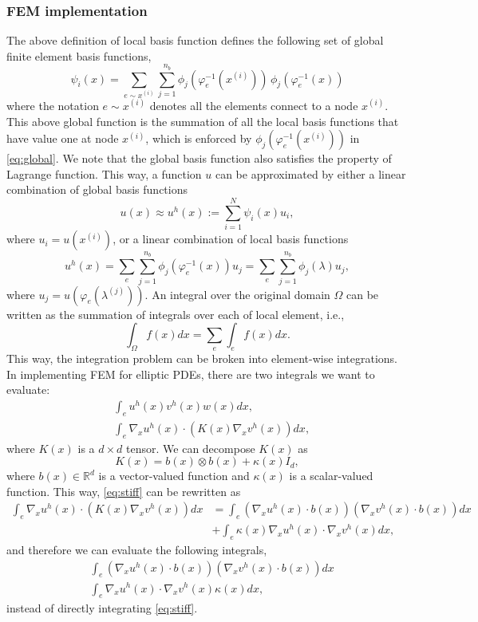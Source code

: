 \documentclass[a4paper,11pt]{scrartcl}
\newcommand{\R}{\mathbb{R}}
\newcommand{\eq}[1]{\begin{equation} #1 \end{equation}}
\newcommand{\eqs}[1]{\begin{align} #1 \end{align}}
\begin{document}
\subsubsection{FEM implementation}

The above definition of local basis function defines the following set of global finite element basis functions,
\eq{
\psi_i(x) =  \sum_{e \sim x^{(i)}} \sum_{j=1}^{n_b} \phi_j( \varphi_e^{-1}(x^{(i)}) ) \, \phi_j( \varphi_e^{-1}(x) ) \label{eq:global}
}
where the notation $e \sim x^{(i)}$ denotes all the elements connect to a node $x^{(i)}$.
%
This above global function is the summation of all the local basis functions that have value one at node $x^{(i)}$, which is enforced by $\phi_j( \varphi_e^{-1}(x^{(i)}) )$ in \eqref{eq:global}.
%
We note that the global basis function also satisfies the property of Lagrange function.
%
This way, a function $u$ can be approximated by either a linear combination of global basis functions
\eq{
u(x) \approx u^h(x) := \sum_{i=1}^{N} \psi_i(x) u_i,
}
where $u_i = u(x^{(i)})$, or a linear combination of local basis functions
\eq{
u^h(x) = \sum_{e} \sum_{j=1}^{n_b} \phi_j( \varphi_e^{-1}(x) ) u_j = \sum_{e} \sum_{j=1}^{n_b} \phi_j( \lambda ) u_j,
}
where $u_j = u(\varphi_e(\lambda^{(j)}))$.
%
An integral over the original domain $\Omega$ can be written as the summation of integrals over each of local element, i.e.,
\eq{
\int_{\Omega} f(x) dx = \sum_{e} \int_e f(x) dx.
}
This way, the integration problem can be broken into element-wise integrations.
%
In implementing FEM for elliptic PDEs, there are two integrals we want to evaluate:
\eqs{
& \int_{e} u^h(x) v^h(x) w(x)  dx ,  \\
& \int_{e} \nabla_x u^h(x) \cdot \left( K(x) \nabla_x v^h(x) \right) dx, \label{eq:stiff}
}
where $K(x)$ is a $d\times d$ tensor. We can decompose $K(x)$ as
\eq{
K(x) = b(x) \otimes b(x) + \kappa(x) I_d,
}
where $b(x) \in \R^d$ is a vector-valued function and $\kappa(x)$ is a scalar-valued function.
%
This way, \eqref{eq:stiff} can be rewritten as
\eqs{
\int_{e} \nabla_x u^h(x) \cdot \left( K(x) \nabla_x v^h(x) \right) dx & = \int_{e} \left( \nabla_x u^h(x) \cdot b(x) \right) \left( \nabla_x v^h(x) \cdot b(x) \right) dx \nonumber \\
& + \int_{e} \kappa(x) \nabla_x u^h(x) \cdot \nabla_x v^h(x) dx,
}
and therefore we can evaluate the following integrals,
\eqs{
& \int_{e} \left( \nabla_x u^h(x) \cdot b(x) \right) \left( \nabla_x v^h(x) \cdot b(x) \right) dx \\
& \int_{e} \nabla_x u^h(x) \cdot \nabla_x v^h(x) \kappa(x)  dx,
}
instead of directly integrating \eqref{eq:stiff}.
\end{document}
